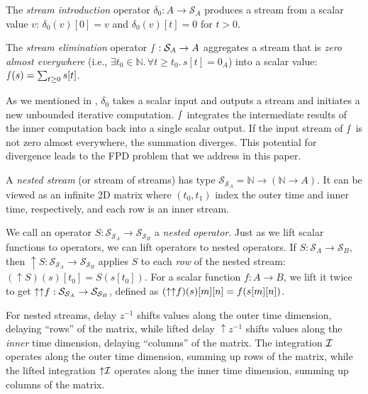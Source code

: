 \begin{definition}\label{def:stream-intro}
The \emph{stream introduction} operator $\delta_0 : A \to \mathcal{S}_A$ produces a stream from a scalar value $v$:
$\delta_0(v)[0] = v$ and $\delta_0(v)[t] = 0$ for $t > 0$.
\end{definition}

\begin{definition}\label{def:stream-elim}
The \emph{stream elimination} operator $\textstyle\smallint : \mathcal{S}_A \to A$ aggregates a stream that is \emph{zero almost everywhere} (i.e., $\exists t_0 \in \mathbb{N}.\, \forall t \geq t_0.\, s[t] = 0_A$) into a scalar value: $\textstyle\smallint(s) = \sum_{t \geq 0} s[t]$.
\end{definition}
As we mentioned in , $\delta_0$ takes a scalar input and outputs a stream and initiates a new unbounded iterative computation. $\smallint$ integrates the intermediate results of the inner computation back into a single scalar output.
If the input stream of $\smallint$ is not zero almost everywhere, the summation diverges. This potential for divergence leads to the FPD problem that we address in this paper.

A \emph{nested stream} (or stream of streams) has type $\mathcal{S}_{\mathcal{S}_A} = \mathbb{N} \to (\mathbb{N} \to A)$. It can be viewed as an infinite 2D matrix where $(t_0, t_1)$ index the outer time and inner time, respectively, and each row is an inner stream. 

We call an operator $S : \mathcal{S}_{\mathcal{S}_A} \to \mathcal{S}_{\mathcal{S}_B}$ a \emph{nested operator}. Just as we lift scalar functions to operators, we can lift operators to nested operators. If $S : \mathcal{S}_A \to \mathcal{S}_B$, then ${\uparrow}S : \mathcal{S}_{\mathcal{S}_A} \to \mathcal{S}_{\mathcal{S}_B}$ applies $S$ to each \emph{row} of the nested stream: $({\uparrow}S)(s)[t_0] = S(s[t_0])$. For a scalar function $f:A \to B$, we lift it twice to get ${\uparrow}{\uparrow}f: \mathcal{S}_{\mathcal{S}_{A}} \to \mathcal{S}_{\mathcal{S}_{B}}$, defined as $({\uparrow}{\uparrow}f)(s)[m][n] = f(s[m][n])$.

For nested streams, delay $z^{-1}$ shifts values along the outer time dimension, delaying ``rows'' of the matrix, while lifted delay ${\uparrow}z^{-1}$ shifts values along the \emph{inner} time dimension, delaying ``columns'' of the matrix. The integration $\mathcal{I}$ operates along the outer time dimension, summing up rows of the matrix, while the lifted integration ${\uparrow}\mathcal{I}$ operates along the inner time dimension, summing up columns of the matrix.


